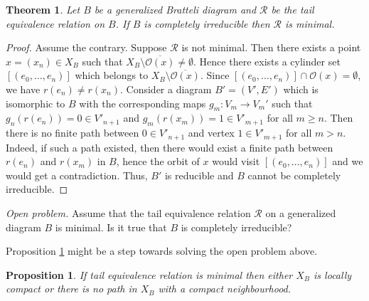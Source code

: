 \documentclass[11pt, twoside]{amsart}
\theoremstyle{definition}
\theoremstyle{remark}
\theoremstyle{plain}
\newtheorem{theorem}[definition]{Theorem}
\newtheorem{prop}[definition]{Proposition}
\newcommand{\tcr}{\textcolor{red}}
\def\ov{\overline}
\numberwithin{equation}{section}
\begin{document}



\begin{theorem}\label{thm:Class1_minimalR}
    Let $B$ be a generalized Bratteli diagram and $\mathcal{R}$ be the tail equivalence relation on $B$. If $B$ is completely irreducible then $\mathcal{R}$ is minimal.
\end{theorem}  

\begin{proof} Assume the contrary. Suppose $\mathcal{R}$ is not minimal. Then there exists a point $x = (x_n) \in X_B$ such that $X_B \setminus \ov{\mathcal{O}(x)} \neq \emptyset$. Hence there exists a cylinder set $[(e_0, \ldots, e_n)]$ which belongs to $X_B \setminus \ov{\mathcal{O}(x)}$. Since $[(e_0, \ldots, e_n)] \cap {\mathcal{O}(x)} = \emptyset$, we have $r(e_n) \neq r(x_n)$.
Consider a diagram $B' = (V', E')$ which is isomorphic to $B$ with the corresponding maps $g_m \colon V_m \rightarrow V_m'$ such that $g_n(r(e_n)) = 0 \in V'_{n+1}$ and $g_m(r(x_m)) = 1 \in V'_{m+1}$ for all $m \geq n$. 
Then there is no finite path between $0 \in V'_{n+1}$ and vertex $1 \in V'_{m+1}$ for all $m > n$. Indeed, if such a path existed, then there would exist a finite path between $r(e_n)$ and $r(x_m)$ in $B$, hence the orbit of $x$ would visit $[(e_0, \ldots, e_n)]$ and we would get a contradiction. Thus, $B'$ is reducible and $B$ cannot be completely irreducible.
\end{proof}

\textit{Open problem.} Assume that the tail equivalence relation $\mathcal{R}$ on a generalized diagram $B$ is minimal. Is it true that $B$ is completely irreducible?

\medskip
Proposition \ref{prop:minloccomp} might be a step towards solving the open problem above.

\begin{prop}\label{prop:minloccomp}
If tail equivalence relation is minimal then either $X_B$ is locally compact or there is no path in $X_B$ with a compact neighbourhood.    
\end{prop}
\end{document}

